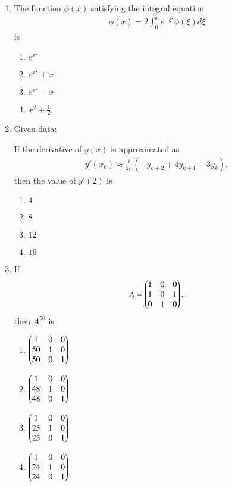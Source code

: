 \documentclass[journal]{IEEEtran}
\numberwithin{equation}{enumi}
\numberwithin{figure}{enumi}
\begin{document}
\begin{enumerate}
\item
The function $\phi(x)$ satisfying the integral equation
\begin{align}
\phi(x) = 2 \int_0^x e^{-\xi^2} \phi(\xi) d\xi
\end{align}
is
\hfill{}
\begin{multicols}{2}
\begin{enumerate}
  \item $e^{x^2}$
  \item $e^{x^2} + x$
  \item $e^{x^2} - x$
  \item $x^2 + \frac{1}{2}$
\end{enumerate}
\end{multicols}

\item
Given data:


If the derivative of $y(x)$ is approximated as
\begin{align}
y'(x_k) \approx \frac{1}{2h} \left(-y_{k+2} + 4 y_{k+1} - 3 y_k\right),
\end{align}
then the value of $y'(2)$ is
\hfill{}
\begin{multicols}{4}
\begin{enumerate}
  \item $4$
  \item $8$
  \item $12$
  \item $16$
\end{enumerate}
\end{multicols}


\item
If 
\begin{align}
A = \begin{pmatrix}
1 & 0 & 0 \\
1 & 0 & 1 \\
0 & 1 & 0
\end{pmatrix},
\end{align}
then $A^{50}$ is
\hfill{}
\begin{multicols}{2}
\begin{enumerate}
  \item $\begin{pmatrix}
1 & 0 & 0 \\
50 & 1 & 0 \\
50 & 0 & 1
\end{pmatrix}$
  \item $\begin{pmatrix}
1 & 0 & 0 \\
48 & 1 & 0 \\
48 & 0 & 1
\end{pmatrix}$
  \item $\begin{pmatrix}
1 & 0 & 0 \\
25 & 1 & 0 \\
25 & 0 & 1
\end{pmatrix}$
  \item $\begin{pmatrix}
1 & 0 & 0 \\
24 & 1 & 0 \\
24 & 0 & 1
\end{pmatrix}$
\end{enumerate}
\end{multicols}


\end{enumerate}
\end{document}
